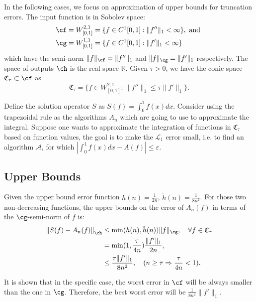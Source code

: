 
\newcommand{\R}{\mathbb{R}}
In the following cases, we focus on approximation of upper bounds for truncation errors. The input function is in Sobolev space:
\begin{align*}
  \cf&=W^{2,1}_{[0,1]}=\{f\in C^1[0,1]: \|f''\|_1<\infty\}, \text{ and }\\
  \cg&=W^{1,1}_{[0,1]}=\{f\in C^1[0,1]: \|f'\|_1<\infty\}
\end{align*}
which have the semi-norm $\|f\|_{\cf}=\|f''\|_{1}$ and $\|f\|_{\cg}=\|f'\|_{1}$ respectively. The space of outputs $\ch$ is the real space $\R$. Given $\tau > 0$, we have the conic space $\mathfrak{C}_{\tau} \subset \cf$ as $$\mathfrak{C}_{\tau}=\{f\in W^{2,1}_{[0,1]}:\|f''\|_1\leq\tau\|f'\|_1\}.$$

Define the solution operator $S$ as $S(f)=\int_{0}^{1}f(x)dx$. Consider using the trapezoidal rule as the algorithms $A_n$ which are going to use to approximate the integral. Suppose one wants to approximate the integration of functions in $\mathfrak{C}_{\tau}$ based on function values, the goal is to make the $\mathcal{L}_1$ error small, i.e. to find an algorithm $\mathcal{A}$, for which $|\int_{0}^{1}f(x)dx-A(f)|\leq \varepsilon$.

\subsection{Upper Bounds}
Given the upper bound error function $h(n)=\frac{1}{2n}$, $\tilde{h}(n)=\frac{1}{8n^2}$. For those two non-decreasing functions, the upper bounds on the error of $A_n(f)$ in terms of the $\cg$-semi-norm of $f$ is:
\begin{align*}
  \left\|S(f)-A_n(f)\right\|_{\ch}& \leq \min(h(n),\tilde{h}(n))\|f\|_{\cg}, \quad \forall f \in \mathfrak{C}_{\tau}\\
  &= \min(1,\frac{\tau}{4n})\frac{\|f'\|_{1}}{2n},\\
  &\leq \frac{\tau\|f'\|_{1}}{8n^2}, \quad (n\geq \tau \Rightarrow \frac{\tau}{4n}<1).
\end{align*}


It is shown that in the specific case, the worst error in $\cf$ will be always smaller than the one in $\cg$. Therefore, the best worst error will be $\frac{1}{8n^2}\|f'\|_1$.

